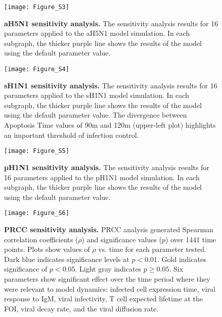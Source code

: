 \documentclass[preprint,10pt,authoryear]{article}
\begin{document}
\pagebreak
\begin{landscape}

\begin{figure}[ht!]
\begin{center}
	\texttt{[image: Figure\_S3]}
	\caption{\textbf{aH5N1 sensitivity analysis.} The sensitivity analysis results for 16 parameters applied to the aH5N1 model simulation.  In each subgraph, the thicker purple line shows the results of the model using the default parameter value.}
	\label{fig:asensitivity}
\end{center}
\end{figure}

\begin{figure}[ht!]
\begin{center}
	\texttt{[image: Figure\_S4]}
	\caption{\textbf{sH1N1 sensitivity analysis.} The sensitivity analysis results for 16 parameters applied to the sH1N1 model simulation.  In each subgraph, the thicker purple line shows the results of the model using the default parameter value.  The divergence between Apoptosis Time values of 90m and 120m (upper-left plot) highlights an important threshold of infection control.}
	\label{fig:ssensitivity}
\end{center}
\end{figure}

\begin{figure}[ht!]
\begin{center}
	\texttt{[image: Figure\_S5]}
	\caption{\textbf{pH1N1 sensitivity analysis.} The sensitivity analysis results for 16 parameters applied to the pH1N1 model simulation.  In each subgraph, the thicker purple line shows the results of the model using the default parameter value.}
	\label{fig:psensitivity}
\end{center}
\end{figure}

\begin{figure}[ht!]
\begin{center}
	\texttt{[image: Figure\_S6]}
	\caption{\textbf{PRCC sensitivity analysis.} PRCC analysis generated Spearman correlation coefficients ($\rho$) and significance values ($p$) over 1441 time points.  Plots show values of $\rho$ vs. time for each parameter tested.  Dark blue indicates significance levels at $p < 0.01$.  Gold indicates significance of $p < 0.05$.  Light gray indicates $p \geq 0.05$.  Six parameters show significant effect over the time period where they were relevant to model dynamics: infected cell expression time, viral response to IgM, viral infectivity, T cell expected lifetime at the FOI, viral decay rate, and the viral diffusion rate.}
	\label{fig:prcc}
\end{center}
\end{figure}

\end{landscape}
\end{document}
